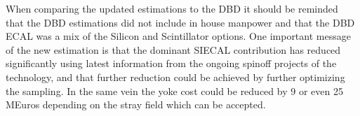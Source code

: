 When comparing the updated estimations to the DBD it should be reminded that the DBD estimations did not include in house manpower and that the DBD ECAL was a mix of the Silicon and Scintillator options. 
One important message of the new estimation is that the dominant SIECAL contribution has reduced significantly using latest information from the ongoing spinoff projects of the technology, and that further reduction could be achieved by further optimizing the sampling. In the same vein the yoke cost could be reduced by 9 or even 25 MEuros depending on the stray field which can be accepted.
